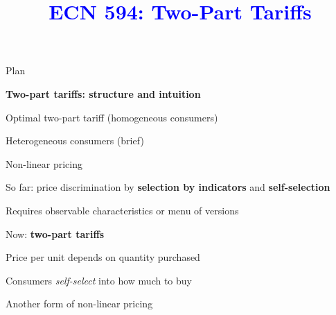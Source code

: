 \documentclass[notes,11pt, aspectratio=169]{beamer}
\title[]{\textcolor{blue}{ECN 594: Two-Part Tariffs}}
\author[PGP]{}
\institute[FRBNY]{\small{\begin{tabular}{c c c}
Nicholas Vreugdenhil \\
\end{tabular}}}
\date{}
\newenvironment{wideitemize}{\itemize\addtolength{\itemsep}{10pt}}{\enditemize}
\newenvironment{wideenumerate}{\enumerate\addtolength{\itemsep}{10pt}}{\endenumerate}
\begin{document}
\begin{frame}
\maketitle
  \centering
\end{frame}




\begin{frame}{Plan}
  \begin{wideenumerate}
    \item \textbf{Two-part tariffs: structure and intuition}
    \item Optimal two-part tariff (homogeneous consumers)
    \item Heterogeneous consumers (brief)
  \end{wideenumerate}
\end{frame}

\begin{frame}{Non-linear pricing}
	\begin{wideitemize}
		\item So far: price discrimination by \textbf{selection by indicators} and \textbf{self-selection}
		\begin{wideitemize}
			\vspace{5pt}
			\item Requires observable characteristics or menu of versions
		\end{wideitemize}
		\item Now: \textbf{two-part tariffs}
		\begin{wideitemize}
			\vspace{5pt}
			\item Price per unit depends on quantity purchased
			\item Consumers \textit{self-select} into how much to buy
		\end{wideitemize}
		\item Another form of non-linear pricing
	\end{wideitemize}
\end{frame}
\end{document}
